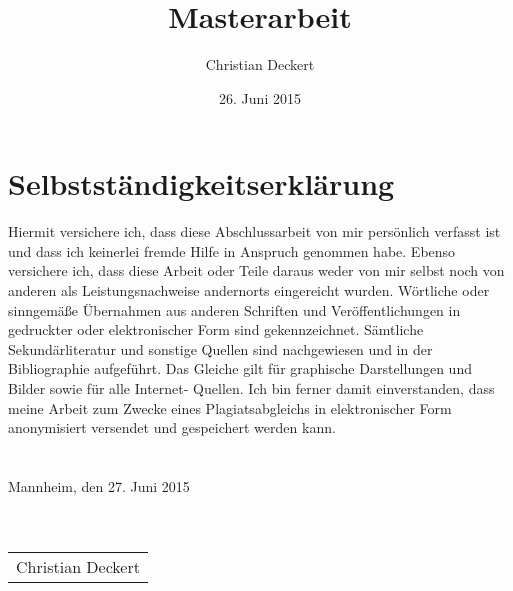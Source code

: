 \documentclass[12pt]{report}
\title{Masterarbeit}
\author{Christian Deckert}
\date{26. Juni 2015}
\begin{document}



\newpage 




\tableofcontents 
\newpage 
\listoffigures 
\newpage
{}


\newpage



\setcounter{page}{1}













\newpage

\setcounter{page}{5}






\chapter*{Selbstständigkeitserklärung}
\thispagestyle{empty}
Hiermit versichere ich, dass diese Abschlussarbeit von mir persönlich verfasst ist und dass ich keinerlei fremde Hilfe in Anspruch genommen habe. Ebenso versichere ich, dass diese Arbeit oder Teile daraus weder von mir selbst noch von anderen als Leistungsnachweise andernorts eingereicht wurden. Wörtliche oder sinngemäße Übernahmen aus anderen Schriften und Veröffentlichungen in gedruckter oder elektronischer Form sind gekennzeichnet. Sämtliche Sekundärliteratur und sonstige Quellen sind nachgewiesen und in der Bibliographie aufgeführt. Das Gleiche gilt für graphische Darstellungen und Bilder sowie für alle Internet- Quellen.
Ich bin ferner damit einverstanden, dass meine Arbeit zum Zwecke eines Plagiatsabgleichs in elektronischer Form anonymisiert versendet und gespeichert werden kann.
\\
\\\\Mannheim, den 27. Juni 2015\\\\\\[6ex]
\flushleft
\newlength\us
\settowidth{\us}{-Christian Deckert-}
\begin{tabular}{p{\us}}\hline
\centering\footnotesize Christian Deckert
\end{tabular}
\end{document}
